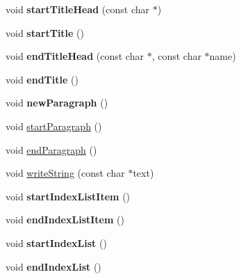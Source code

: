 \begin{DoxyCompactItemize}
\item 
\hypertarget{class_r_t_f_generator_a3f80d51c2cd9ad266f0dc628d4c349da}{void {\bfseries start\-Title\-Head} (const char $\ast$)}\label{class_r_t_f_generator_a3f80d51c2cd9ad266f0dc628d4c349da}

\item 
\hypertarget{class_r_t_f_generator_a1259e131d6695a4bb53ec5e36692840a}{void {\bfseries start\-Title} ()}\label{class_r_t_f_generator_a1259e131d6695a4bb53ec5e36692840a}

\item 
\hypertarget{class_r_t_f_generator_a095d838ffc4c59e810a264f887698285}{void {\bfseries end\-Title\-Head} (const char $\ast$, const char $\ast$name)}\label{class_r_t_f_generator_a095d838ffc4c59e810a264f887698285}

\item 
\hypertarget{class_r_t_f_generator_a7b02cc485cad21197a018533aa05fe79}{void {\bfseries end\-Title} ()}\label{class_r_t_f_generator_a7b02cc485cad21197a018533aa05fe79}

\item 
\hypertarget{class_r_t_f_generator_ab2d43850490bfdac83306b85c7c6265f}{void {\bfseries new\-Paragraph} ()}\label{class_r_t_f_generator_ab2d43850490bfdac83306b85c7c6265f}

\item 
void \hyperlink{class_r_t_f_generator_af7f590b00ecbe6117ddc09f0016df0ec}{start\-Paragraph} ()
\item 
void \hyperlink{class_r_t_f_generator_a3076b52ebe72e4b56c232817cf2a16f0}{end\-Paragraph} ()
\item 
void \hyperlink{class_r_t_f_generator_a02588a2412fdda1d3d31066be2802913}{write\-String} (const char $\ast$text)
\item 
\hypertarget{class_r_t_f_generator_a54bfbe844dbbb52acf519e07a207c2e0}{void {\bfseries start\-Index\-List\-Item} ()}\label{class_r_t_f_generator_a54bfbe844dbbb52acf519e07a207c2e0}

\item 
\hypertarget{class_r_t_f_generator_aec53f232bba59300d9a4fd4b1cf0f753}{void {\bfseries end\-Index\-List\-Item} ()}\label{class_r_t_f_generator_aec53f232bba59300d9a4fd4b1cf0f753}

\item 
\hypertarget{class_r_t_f_generator_a9b31ceb5ba1248cb820bad23a8c6624a}{void {\bfseries start\-Index\-List} ()}\label{class_r_t_f_generator_a9b31ceb5ba1248cb820bad23a8c6624a}

\item 
\hypertarget{class_r_t_f_generator_a38fc8c258fcd3d6196e12c1a51018c9a}{void {\bfseries end\-Index\-List} ()}\label{class_r_t_f_generator_a38fc8c258fcd3d6196e12c1a51018c9a}


\end{DoxyCompactItemize}
